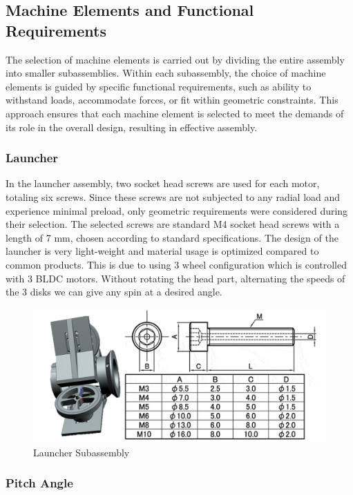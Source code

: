 \documentclass[12pt]{article}
\begin{document}
\subsection{Machine Elements and Functional Requirements}

The selection of machine elements is carried out by dividing the entire assembly into smaller subassemblies. Within each subassembly, the choice of machine elements is guided by specific functional requirements, such as ability to withstand loads, accommodate forces, or fit within geometric constraints. This approach ensures that each machine element is selected to meet the demands of its role in the overall design, resulting in effective assembly.


\subsubsection{Launcher}

In the launcher assembly, two socket head screws are used for each motor, totaling six screws. Since these screws are not subjected to any radial load and experience minimal preload, only geometric requirements were considered during their selection. The selected screws are standard M4 socket head screws with a length of 7 mm, chosen according to standard specifications. The design of the launcher is very light-weight and material usage is optimized compared to common products. This is due to using 3 wheel configuration which is controlled with 3 BLDC motors. Without rotating the head part, alternating the speeds of the 3 disks we can give any spin at a desired angle.

\begin{figure}[h!]
    \centering
    \includegraphics[width=0.7\linewidth]{2.3.1.png}
    \caption{Launcher Subassembly}
    \label{fig:enter-label}
\end{figure}

\subsubsection{Pitch Angle}
\end{document}
